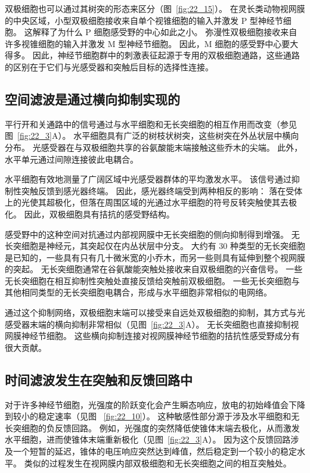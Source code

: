 双极细胞也可以通过其树突的形态来区分（图~\ref{fig:22_15}）。
在灵长类动物视网膜的中央区域，小型双极细胞接收来自单个视锥细胞的输入并激发 P 型神经节细胞。
这解释了为什么 P 细胞感受野的中心如此之小。
弥漫性双极细胞接收来自许多视锥细胞的输入并激发 M 型神经节细胞。
因此，M 细胞的感受野中心要大得多。
因此，神经节细胞群中的刺激表征起源于专用的双极细胞通路，这些通路的区别在于它们与光感受器和突触后目标的选择性连接。



\subsection{空间滤波是通过横向抑制实现的}

平行开和关通路中的信号通过与水平细胞和无长突细胞的相互作用而改变（参见图~\ref{fig:22_3}A）。
水平细胞具有广泛的树枝状树突，这些树突在外丛状层中横向分布。
光感受器在与双极细胞共享的谷氨酸能末端接触这些乔木的尖端。
此外，水平单元通过间隙连接彼此电耦合。


水平细胞有效地测量了广阔区域中光感受器群体的平均激发水平。
该信号通过抑制性突触反馈到感光器终端。
因此，感光器终端受到两种相反的影响：
落在受体上的光使其超极化，但落在周围区域的光通过水平细胞的符号反转突触使其去极化。
因此，双极细胞具有拮抗的感受野结构。


感受野中的这种空间对抗通过内部视网膜中无长突细胞的侧向抑制得到增强。
无长突细胞是神经元，其突起仅在内丛状层中分支。
大约有 30 种类型的无长突细胞是已知的，一些具有只有几十微米宽的小乔木，而另一些则具有延伸到整个视网膜的突起。
无长突细胞通常在谷氨酸能突触处接收来自双极细胞的兴奋信号。
一些无长突细胞在相互抑制性突触处直接反馈给突触前双极细胞。
一些无长突细胞与其他相同类型的无长突细胞电耦合，形成与水平细胞非常相似的电网络。


通过这个抑制网络，双极细胞末端可以接受来自远处双极细胞的抑制，其方式与光感受器末端的横向抑制非常相似（见图~\ref{fig:22_3}A）。
无长突细胞也直接抑制视网膜神经节细胞。
这些横向抑制连接对视网膜神经节细胞的拮抗性感受野成分有很大贡献。



\subsection{时间滤波发生在突触和反馈回路中}

对于许多神经节细胞，光强度的阶跃变化会产生瞬态响应，放电的初始峰值会下降到较小的稳定速率（见图 ~\ref{fig:22_10}）。
这种敏感性部分源于涉及水平细胞和无长突细胞的负反馈回路。
例如，光强度的突然降低使锥体末端去极化，从而激发水平细胞，进而使锥体末端重新极化（见图~\ref{fig:22_3}A）。
因为这个反馈回路涉及一个短暂的延迟，锥体的电压响应突然达到峰值，然后稳定到一个较小的稳定水平。
类似的过程发生在视网膜内部双极细胞和无长突细胞之间的相互突触处。


